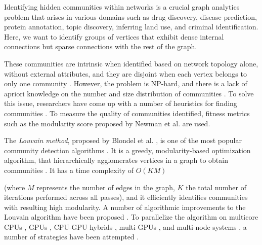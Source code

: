Identifying hidden communities within networks is a crucial graph analytics problem that arises in various domains such as drug discovery, disease prediction, protein annotation, topic discovery, inferring land use, and criminal identification. Here, we want to identify groups of vertices that exhibit dense internal connections but sparse connections with the rest of the graph. These communities are intrinsic when identified based on network topology alone, without external attributes, and they are disjoint when each vertex belongs to only one community \cite{com-gregory10}. However, the problem is NP-hard, and there is a lack of apriori knowledge on the number and size distribution of communities \cite{com-blondel08}. To solve this issue, researchers have come up with a number of heuristics for finding communities \cite{com-guimera05, com-derenyi05, com-newman06, com-reichardt06, com-raghavan07, com-blondel08, com-rosvall08, infomap-rosvall09, com-fortunato10, com-gregory10, com-kloster14, com-come15, com-ruan15, com-newman16, com-ghoshal19, com-rita20, com-lu20, com-gupta22}. To measure the quality of communities identified, fitness metrics such as the modularity score proposed by Newman et al. \cite{com-newman06} are used.

The \textit{Louvain method}, proposed by Blondel et al. \cite{com-blondel08}, is one of the most popular community detection algorithms \cite{com-lancichinetti09}. It is a greedy, modularity-based optimization algorithm, that hierarchically agglomerates vertices in a graph to obtain communities \cite{com-blondel08}. It has a time complexity of $O(KM)$ (where $M$ represents the number of edges in the graph, $K$ the total number of iterations performed across all passes), and it efficiently identifies communities with resulting high modularity. A number of algorithmic improvements to the Louvain algorithm have been proposed \cite{com-rotta11, com-waltman13, com-gach14, com-ryu16, com-ozaki16, com-traag15, com-lu15, com-naim17, com-halappanavar17, com-ghosh18, com-traag19, com-shi21, com-zhang21, com-you22, com-aldabobi22}. To parallelize the algorithm on multicore CPUs \cite{staudt2015engineering, staudt2016networkit, com-fazlali17, com-halappanavar17, qie2022isolate}, GPUs \cite{com-naim17}, CPU-GPU hybrids \cite{com-bhowmik19, com-mohammadi20}, multi-GPUs \cite{com-cheong13, hricik2020using, chou2022batched, com-gawande22}, and multi-node systems \cite{com-ghosh18, ghosh2018scalable, sattar2022scalable, com-bhowmick22}, a number of strategies have been attempted \cite{com-cheong13, com-wickramaarachchi14, com-zeng15, com-que15, com-fazlali17, com-naim17, com-halappanavar17, com-ghosh18, com-bhowmik19, com-mohammadi20, com-shi21, com-bhowmick22}.

